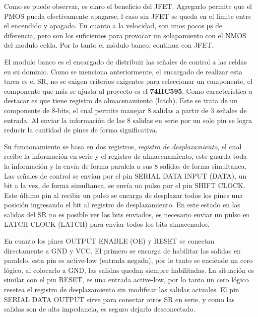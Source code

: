 Como se puede observar, es claro el beneficio del JFET. Agregarlo permite que el PMOS pueda efectivamente apagarse, l caso sin JFET se queda en el limite entre el encendido y apagado. En cuanto a la velocidad, son unos pocos \si{\micro \second} de diferencia, pero son los suficientes para provocar un solapamiento con el NMOS del modulo celda. Por lo tanto el módulo banco, continua con JFET.





El modulo banco es el encargado de distribuir las señales de control a las celdas en su dominio. Como se menciona anteriormente, el encargado de realizar esta tarea es el SR, no se exigen criterios exigentes para seleccionar un componente, el componente que más se ajusta al proyecto es el \textbf{74HC595}. Como característica a destacar es que tiene registro de almacenamiento (latch). Este se trata de un componente de 8-bits, el cual permite manejar 8 salidas a partir de 3 señales de entrada. Al enviar la información de las 8 salidas en serie por un solo pin se logra reducir la cantidad de pines de forma significativa. 


Su funcionamiento se basa en dos registros, \textit{registro de desplazamiento}, el cual recibe la información en serie y el registro de almacenamiento, este guarda toda la información y la envía de forma paralela a sus 8 salidas de forma simultanea.
Las señales de control se envían por el pin SERIAL DATA INPUT (DATA), un bit a la vez, de forma simultanea, se  envía un pulso por el pin SHIFT CLOCK. Este último pin al recibir un pulso se encarga de desplazar todos los pines una posición ingresando el bit al registro de desplazamiento. En este estado en las salidas del SR no es posible ver los bits enviados, es necesario enviar un pulso en LATCH CLOCK (LATCH) para enviar todos los bits almacenados.

En cuanto los pines OUTPUT ENABLE (OE) y RESET se conectan directamente a GND y VCC. El primero se encarga de habilitar las salidas en paralelo, esta pin es active-low (entrada negada), por lo tanto se enciende un cero lógico, al colocarlo a GND, las salidas quedan siempre habilitadas. La situación es similar con el pin RESET, es una entrada active-low, por lo tanto un cero lógico resetea el registro de desplazamiento sin modificar las salidas actuales. El pin SERIAL DATA OUTPUT sirve para conectar otros SR en serie, y como las salidas son de alta impedancia, es seguro dejarlo desconectado.






